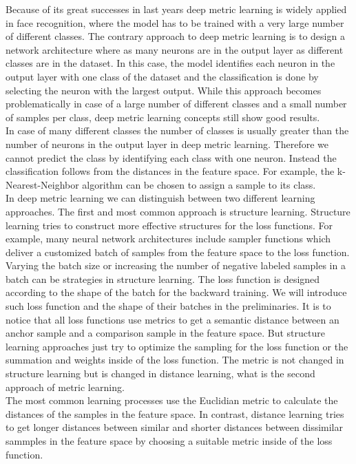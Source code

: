 \documentclass[12pt,paper=a4]{scrartcl}
\theoremstyle{break}
\begin{document}
Because of its great successes in last years deep metric learning is widely applied in face recognition, where the model has to be trained with a very large number of different classes. The contrary approach to deep metric learning is to design a network architecture where as many neurons are in the output layer as different classes are in the dataset. In this case, the model identifies each neuron in the output layer with one class of the dataset and the classification is done by selecting the neuron with the largest output. While this approach becomes problematically in case of a large number of different classes and a small number of samples per class, deep metric learning concepts still show good results. \\
In case of many different classes the number of classes is usually greater than the number of neurons in the output layer in deep metric learning. Therefore we cannot predict the class by identifying each class with one neuron. Instead the classification follows from the distances in the feature space. For example, the k-Nearest-Neighbor algorithm can be chosen to assign a sample to its class. \\
In deep metric learning we can distinguish between two different learning approaches. The first and most common approach is structure learning. Structure learning tries to construct more effective structures for the loss functions. For example, many neural network architectures include sampler functions which deliver a customized batch of samples from the feature space to the loss function. Varying the batch size or increasing the number of negative labeled samples in a batch can be strategies in structure learning. The loss function is designed according to the shape of the batch for the backward training. We will introduce such loss function and the shape of their batches in the preliminaries. It is to notice that all loss functions use metrics to get a semantic distance between an anchor sample and a comparison sample in the feature space. But structure learning approaches just try to optimize the sampling for the loss function or the summation and weights inside of the loss function. The metric is not changed in structure learning but is changed in distance learning, what is the second approach of metric learning. \\
The most common learning processes use the Euclidian metric to calculate the distances of the samples in the feature space. In contrast, distance learning tries to get longer distances between similar and shorter distances between dissimilar sammples in the feature space by choosing a suitable metric inside of the loss function.
\end{document}
